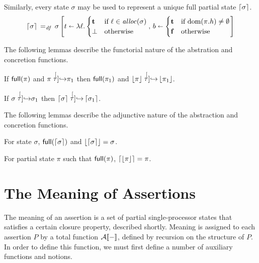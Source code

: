 \documentclass[11pt]{report}
\begin{document}
Similarly, every state $\sigma$ may be used to represent a unique full partial state $\left\lceil\sigma\right\rceil$. \begin{equation}
	\left\lceil\sigma\right\rceil \operatorname{\;=_{\mathit{df}}\;} \sigma \left[ t \shortleftarrow \lambda \ell . \begin{cases}
		\mathbf{t} & \text{if $\ell \in \mathit{alloc}(\sigma)$} \\
		\bot & \text{otherwise}
	\end{cases},\, b \shortleftarrow \begin{cases}
		\mathbf{t} & \text{if $\operatorname{\mathrm{dom}}(\pi.h) \neq \operatorname{\emptyset}$} \\
		\mathbf{f} & \text{otherwise}
	\end{cases} \right]
\end{equation}

The following lemmas describe the functorial nature of the abstration and concretion functions. 

\begin{lemma}
	\label{lem:concst-tau}
	If $\mathsf{full}(\pi)$ and $\pi \stackrel[\tau]{}{\operatorname{\hookrightarrow}} \pi_1$ then $\mathsf{full}(\pi_1)$ and $\left\lfloor\pi\right\rfloor \stackrel[\tau]{}{\operatorname{\hookrightarrow}} \left\lfloor\pi_1\right\rfloor$. 
\end{lemma}

\begin{lemma}
	\label{lem:abst-tau}
	If $\sigma \stackrel[\tau]{}{\operatorname{\hookrightarrow}} \sigma_1$ then $\left\lceil\sigma\right\rceil \stackrel[\tau]{}{\operatorname{\hookrightarrow}} \left\lceil\sigma_1\right\rceil$. 
\end{lemma}

The following lemmas describe the adjunctive nature of the abstraction and concretion functions.

\begin{lemma}
	\label{lem:concst-abst}
	For state $\sigma$, $\mathsf{full}(\left\lceil\sigma\right\rceil)$ and $\left\lfloor\left\lceil\sigma\right\rceil\right\rfloor = \sigma$. 
\end{lemma}

\begin{lemma}
	\label{lem:abst-concst}
	For partial state $\pi$ such that $\mathsf{full}(\pi)$, $\left\lceil\left\lfloor\pi\right\rfloor\right\rceil = \pi$.
\end{lemma}

\section{The Meaning of Assertions} %
\label{sec:assertion-semantics}

The meaning of an assertion is a set of partial single-processor states that satisfies a certain closure property, described shortly. Meaning is assigned to each assertion $P$ by a total function $\mathcal{A}[\![-]\!]$, defined by recursion on the structure of $P$. In order to define this function, we must first define a number of auxiliary functions and notions.
\end{document}

